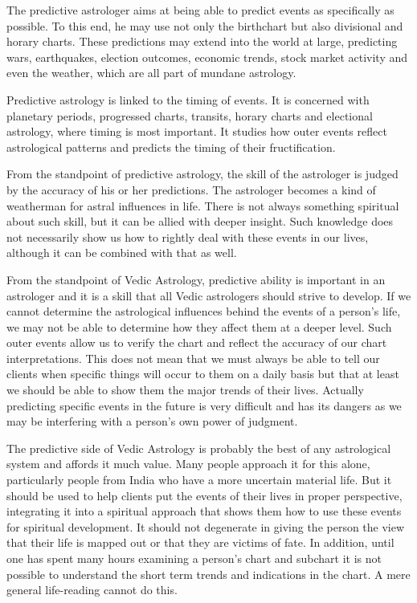  

The predictive astrologer aims at being able to predict events as specifically as possible. To this end, he may use not only the birthchart but also divisional and horary charts. These predictions may extend into the world at large, predicting wars, earthquakes, election outcomes, economic trends, stock market activity and even the weather, which are all part of mundane astrology.

 

Predictive astrology is linked to the timing of events. It is concerned with planetary periods, progressed charts, transits, horary charts and electional astrology, where timing is most important. It studies how outer events reflect astrological patterns and predicts the timing of their fructification.

 

From the standpoint of predictive astrology, the skill of the astrologer is judged by the accuracy of his or her predictions. The astrologer becomes a kind of weatherman for astral influences in life. There is not always something spiritual about such skill, but it can be allied with deeper insight. Such knowledge does not necessarily show us how to rightly deal with these events in our lives, although it can be combined with that as well.

 

From the standpoint of Vedic Astrology, predictive ability is important in an astrologer and it is a skill that all Vedic astrologers should strive to develop. If we cannot determine the astrological influences behind the events of a person’s life, we may not be able to determine how they affect them at a deeper level. Such outer events allow us to verify the chart and reflect the accuracy of our chart interpretations. This does not mean that we must always be able to tell our clients when specific things will occur to them on a daily basis but that at least we should be able to show them the major trends of their lives. Actually predicting specific events in the future is very difficult and has its dangers as we may be interfering with a person’s own power of judgment.

 

The predictive side of Vedic Astrology is probably the best of any astrological system and affords it much value. Many people approach it for this alone, particularly people from India who have a more uncertain material life. But it should be used to help clients put the events of their lives in proper perspective, integrating it into a spiritual approach that shows them how to use these events for spiritual development. It should not degenerate in giving the person the view that their life is mapped out or that they are victims of fate. In addition, until one has spent many hours examining a person’s chart and subchart it is not possible to understand the short term trends and indications in the chart. A mere general life-reading cannot do this.

